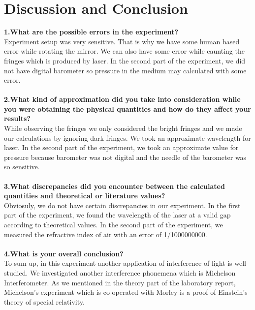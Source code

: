 \documentclass[a4paper,12pt]{report}
\begin{document}
\chapter{Discussion and Conclusion}
\textbf{1.What are the possible errors in the experiment?}\\
Experiment setup was very sensitive. That is why we have some human based error while rotating the mirror. We can also have some error while caunting the fringes which is produced by laser. In the second part of the experiment, we did not have digital barometer so pressure in the medium may calculated with some error.\\\\
\textbf{2.What kind of approximation did you take into consideration while you were obtaining the physical quantities and how do they affect your results?}\\
While observing the fringes we only considered the bright fringes and we made our calculations by ignoring dark fringes. We took an approximate wavelength for laser. In the second part of the experiment, we took an approximate value for pressure because barometer was not digital and the needle of the barometer was so sensitive.\\\\ 
\textbf{3.What discrepancies did you encounter between the calculated quantities and theoretical or literature values?}\\
Obviosuly, we do not have certain discrepancies in our experiment. In the first part of the experiment, we found the wavelength of the laser at a valid gap according to theoretical values. In the second part of the experiment, we measured the refractive index of air with an error of 1/1000000000.\\\\
\textbf{4.What is your overall conclusion?}\\
To sum up, in this experiment another application of interference of light is well studied. We investigated another interference phonemena which is Michelson Interferometer. As we mentioned in the theory part of the laboratory report, Michelson's experiment which is co-operated with Morley is a proof of Einstein's theory of special relativity.  
\end{document}
